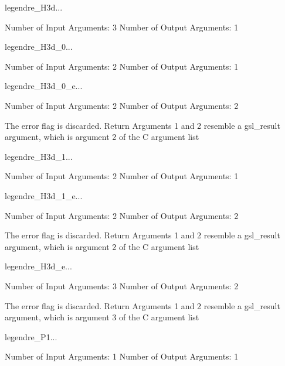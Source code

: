 \begin{funcdesc}{legendre_H3d}{...}

    Number of Input  Arguments:  3
    Number of Output Arguments:  1
\end{funcdesc}

\begin{funcdesc}{legendre_H3d_0}{...}

    Number of Input  Arguments:  2
    Number of Output Arguments:  1
\end{funcdesc}

\begin{funcdesc}{legendre_H3d_0_e}{...}

    Number of Input  Arguments:  2
    Number of Output Arguments:  2

The error flag is discarded.
Return Arguments 1 and 2 resemble a gsl_result argument,
	which is  argument 2 of the C argument list

\end{funcdesc}

\begin{funcdesc}{legendre_H3d_1}{...}

    Number of Input  Arguments:  2
    Number of Output Arguments:  1
\end{funcdesc}

\begin{funcdesc}{legendre_H3d_1_e}{...}

    Number of Input  Arguments:  2
    Number of Output Arguments:  2

The error flag is discarded.
Return Arguments 1 and 2 resemble a gsl_result argument,
	which is  argument 2 of the C argument list

\end{funcdesc}

\begin{funcdesc}{legendre_H3d_e}{...}

    Number of Input  Arguments:  3
    Number of Output Arguments:  2

The error flag is discarded.
Return Arguments 1 and 2 resemble a gsl_result argument,
	which is  argument 3 of the C argument list

\end{funcdesc}

\begin{funcdesc}{legendre_P1}{...}

    Number of Input  Arguments:  1
    Number of Output Arguments:  1
\end{funcdesc}

